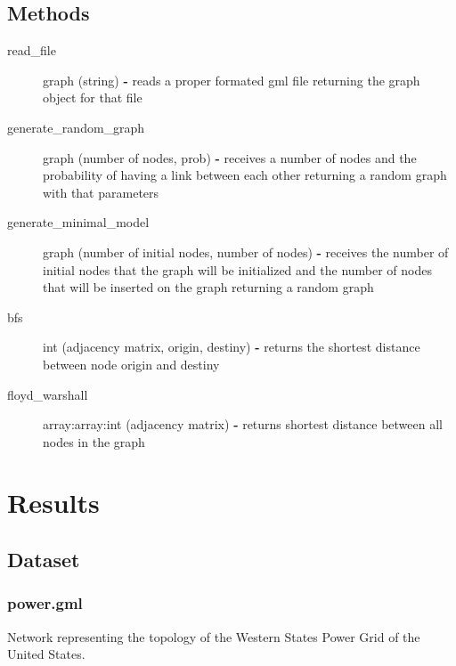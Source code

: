\documentclass[a4paper,titlepage,11pt]{article}
\begin{document}
\subsection*{Methods}
\begin{description}
\item [read\_file] graph (string) \textbf{-} reads a proper formated gml file returning the graph object for that file
\item [generate\_random\_graph] graph (number of nodes, prob) \textbf{-} receives a number of nodes and the probability of
                                                            having a link between each other returning a random graph with that parameters
\item [generate\_minimal\_model] graph (number of initial nodes, number of nodes) \textbf{-} receives the number of initial nodes that the 																graph will be initialized and the number of nodes that will be inserted on 																 the graph returning a random graph
\item [bfs] int (adjacency matrix, origin, destiny) \textbf{-} returns the shortest distance between node origin and destiny
\item [floyd\_warshall] array:array:int (adjacency matrix) \textbf{-} returns shortest distance between all nodes in the graph

\end{description}

\newpage

\section{Results}
\subsection{Dataset}
\subsubsection{power.gml}
Network representing the topology of the Western States Power Grid of the United States.
\end{document}
